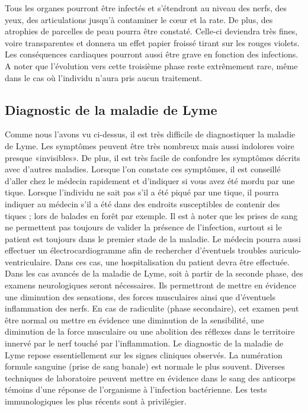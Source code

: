\documentclass[12pt,a4wide]{article}
\begin{document}
Tous les organes pourront être infectés et s'étendront au niveau des nerfs, des yeux, des articulations jusqu'à contaminer le cœur et la rate. De plus, des atrophies de parcelles de peau pourra être constaté. Celle-ci deviendra très fines, voire transparentes et donnera un effet papier froissé tirant sur les rouges violets. Les conséquences cardiaques pourront aussi être grave en fonction des infections.
A noter que l'évolution vers cette troisième phase reste extrêmement rare, même dans le cas où l'individu n'aura pris aucun traitement.


\subsection{Diagnostic de la maladie de Lyme}
\label{sec-3-4}

Comme nous l'avons vu ci-dessus, il est très difficile de diagnostiquer la maladie de Lyme. Les symptômes peuvent être très nombreux mais aussi indolores voire presque «invisibles». De plus, il est très facile de confondre les symptômes décrits avec d'autres maladies. Lorsque l'on constate ces symptômes, il est conseillé d'aller chez le médecin rapidement et d'indiquer si vous avez été mordu par une tique. Lorsque l'individu ne sait pas s'il a été piqué par une tique, il pourra indiquer au médecin s'il a été dans des endroits susceptibles de contenir des tiques ; lors de balades en forêt par exemple. 
 Il est à noter que les prises de sang ne permettent pas toujours de valider la présence de l'infection, surtout si le patient est toujours dans le premier stade de la maladie. Le médecin pourra aussi effectuer un électrocardiogramme afin de rechercher d'éventuels troubles auriculo-ventriculaire. Dans ces cas, une hospitalisation du patient devra être effectuée.
Dans les cas avancés de la maladie de Lyme, soit à partir de la seconde phase, des examens neurologiques seront nécessaires. Ils permettront de mettre en évidence une diminution des sensations, des forces musculaires ainsi que d'éventuels inflammation des nerfs. En cas de radiculite (phase secondaire), cet examen peut être normal ou mettre en évidence une diminution de la sensibilité, une diminution de la force musculaire ou une abolition des réflexes dans le territoire innervé par le nerf touché par l'inflammation.
Le diagnostic de la maladie de Lyme repose essentiellement sur les signes cliniques observés.
La numération formule sanguine (prise de sang banale) est normale le plus souvent.
Diverses techniques de laboratoire peuvent mettre en évidence dans le sang des anticorps témoins d'une réponse de l'organisme à l'infection bactérienne. Les tests immunologiques les plus récents sont à privilégier.
\end{document}
